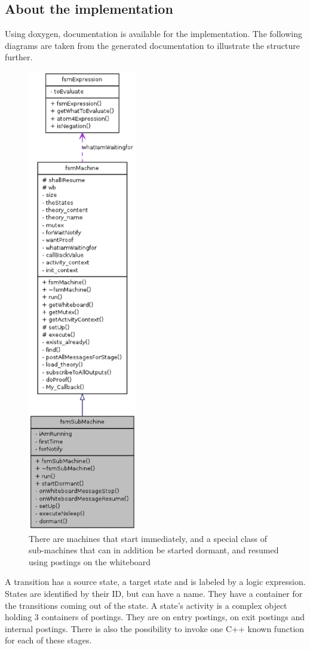 \documentclass[11pt]{article}
\begin{document}
\subsection{About the implementation}
Using doxygen, documentation is available for the implementation. The following diagrams
are taken from the generated documentation to illustrate the structure further.
\begin{figure}
\includegraphics[height=8in]{classfsmSubMachine}
\caption{There are machines that start immediately, and a special class of sub-machines
that can in addition be started dormant, and resumed using postings on the
whiteboard}
\end{figure}

A transition has a source state, a target state and is labeled by a logic expression.
States are identified by their ID, but can have a name. They have a container
for the transitions coming out of the state.
A state's activity is a complex object holding 3 containers of postings.
They are on entry postings, on exit postings and internal postings. There
is also the possibility to invoke one C++ known function for each of these
stages.
\end{document}
